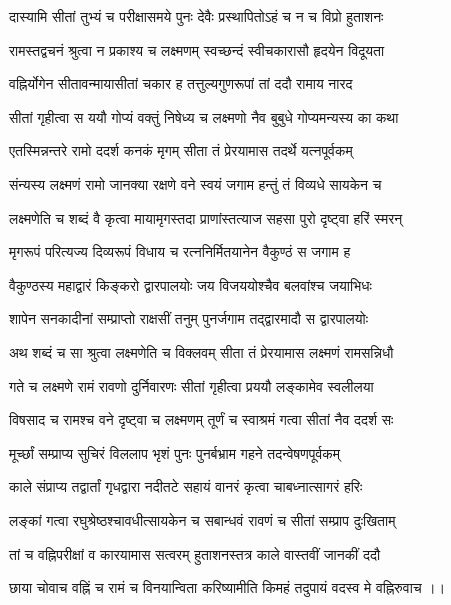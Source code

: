 \twolineshloka
{दास्यामि सीतां तुभ्यं च परीक्षासमये पुनः}
{देवैः प्रस्थापितोऽहं च न च विप्रो हुताशनः}%

\twolineshloka
{रामस्तद्वचनं श्रुत्वा न प्रकाश्य च लक्ष्मणम्}
{स्वच्छन्दं स्वीचकारासौ हृदयेन विदूयता}%

\twolineshloka
{वह्निर्योगेन सीतावन्मायासीतां चकार ह}
{तत्तुल्यगुणरूपां तां ददौ रामाय नारद}%

\twolineshloka
{सीतां गृहीत्वा स ययौ गोप्यं वक्तुं निषेध्य च}
{लक्ष्मणो नैव बुबुधे गोप्यमन्यस्य का कथा}%

\twolineshloka
{एतस्मिन्नन्तरे रामो ददर्श कनकं मृगम्}
{सीता तं प्रेरयामास तदर्थे यत्नपूर्वकम्}%

\twolineshloka
{संन्यस्य लक्ष्मणं रामो जानक्या रक्षणे वने}
{स्वयं जगाम हन्तुं तं विव्यधे सायकेन च}%

\twolineshloka
{लक्ष्मणेति च शब्दं वै कृत्वा मायामृगस्तदा}
{प्राणांस्तत्याज सहसा पुरो दृष्ट्वा हरिं स्मरन्}%

\twolineshloka
{मृगरूपं परित्यज्य दिव्यरूपं विधाय च}
{रत्ननिर्मितयानेन वैकुण्ठं स जगाम ह}%

\twolineshloka
{वैकुण्ठस्य महाद्वारं किङ्करो द्वारपालयोः}
{जय विजययोश्चैव बलवांश्च जयाभिधः}%

\twolineshloka
{शापेन सनकादीनां सम्प्राप्तो राक्षसीं तनुम्}
{पुनर्जगाम तद्द्वारमादौ स द्वारपालयोः}%

\twolineshloka
{अथ शब्दं च सा श्रुत्वा लक्ष्मणेति च विक्लवम्}
{सीता तं प्रेरयामास लक्ष्मणं रामसन्निधौ}%

\twolineshloka
{गते च लक्ष्मणे रामं रावणो दुर्निवारणः}
{सीतां गृहीत्वा प्रययौ लङ्कामेव स्वलीलया}%

\twolineshloka
{विषसाद च रामश्च वने दृष्ट्वा च लक्ष्मणम्}
{तूर्णं च स्वाश्रमं गत्वा सीतां नैव ददर्श सः}%

\twolineshloka
{मूर्च्छां सम्प्राप्य सुचिरं विललाप भृशं पुनः}
{पुनर्बभ्राम गहने तदन्वेषणपूर्वकम्}%

\twolineshloka
{काले संप्राप्य तद्वार्तां गृधद्वारा नदीतटे}
{सहायं वानरं कृत्वा चाबध्नात्सागरं हरिः}%

\twolineshloka
{लङ्कां गत्वा रघुश्रेष्ठश्चावधीत्सायकेन च}
{सबान्धवं रावणं च सीतां सम्प्राप दुःखिताम्}%

\twolineshloka
{तां च वह्निपरीक्षां व कारयामास सत्वरम्}
{हुताशनस्तत्र काले वास्तवीं जानकीं ददौ}%

\twolineshloka
{छाया चोवाच वह्निं च रामं च विनयान्विता}
{करिष्यामीति किमहं तदुपायं वदस्व मे}%
वह्निरुवाच ।।

